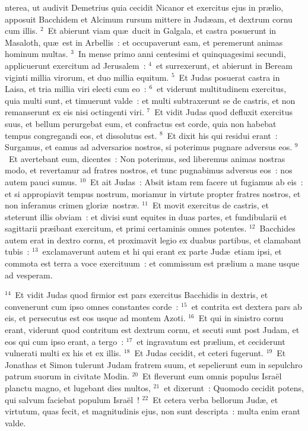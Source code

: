 \bchapter
{}nterea, ut audivit Demetrius quia cecidit Nicanor et exercitus ejus in pr\ae lio, apposuit Bacchidem et Alcimum rursum mittere in Jud\ae am, et dextrum cornu cum illis.
${}^{2}$~Et abierunt viam qu\ae\ ducit in Galgala, et castra posuerunt in Masaloth, qu\ae\ est in Arbellis~: et occupaverunt eam, et peremerunt animas hominum multas.
${}^{3}$~In mense primo anni centesimi et quinquagesimi secundi, applicuerunt exercitum ad Jerusalem~:
${}^{4}$~et surrexerunt, et abierunt in Beream viginti millia virorum, et duo millia equitum.
${}^{5}$~Et Judas posuerat castra in Laisa, et tria millia viri electi cum eo~:
${}^{6}$~et viderunt multitudinem exercitus, quia multi sunt, et timuerunt valde~: et multi subtraxerunt se de castris, et non remanserunt ex eis nisi octingenti viri.
${}^{7}$~Et vidit Judas quod defluxit exercitus suus, et bellum perurgebat eum, et confractus est corde, quia non habebat tempus congregandi eos, et dissolutus est.
${}^{8}$~Et dixit his qui residui erant~: Surgamus, et eamus ad adversarios nostros, si poterimus pugnare adversus eos.
${}^{9}$~Et avertebant eum, dicentes~: Non poterimus, sed liberemus animas nostras modo, et revertamur ad fratres nostros, et tunc pugnabimus adversus eos~: nos autem pauci sumus.
${}^{10}$~Et ait Judas~: Absit istam rem facere ut fugiamus ab eis~: et si appropiavit tempus nostrum, moriamur in virtute propter fratres nostros, et non inferamus crimen glori\ae\ nostr\ae .
${}^{11}$~Et movit exercitus de castris, et steterunt illis obviam~: et divisi sunt equites in duas partes, et fundibularii et sagittarii pr\ae ibant exercitum, et primi certaminis omnes potentes.
${}^{12}$~Bacchides autem erat in dextro cornu, et proximavit legio ex duabus partibus, et clamabant tubis~:
${}^{13}$~exclamaverunt autem et hi qui erant ex parte Jud\ae\ etiam ipsi, et commota est terra a voce exercituum~: et commissum est pr\ae lium a mane usque ad vesperam.


${}^{14}$~Et vidit Judas quod firmior est pars exercitus Bacchidis in dextris, et convenerunt cum ipso omnes constantes corde~:
${}^{15}$~et contrita est dextera pars ab eis, et persecutus est eos usque ad montem Azoti.
${}^{16}$~Et qui in sinistro cornu erant, viderunt quod contritum est dextrum cornu, et secuti sunt post Judam, et eos qui cum ipso erant, a tergo~:
${}^{17}$~et ingravatum est pr\ae lium, et ceciderunt vulnerati multi ex his et ex illis.
${}^{18}$~Et Judas cecidit, et ceteri fugerunt.
${}^{19}$~Et Jonathas et Simon tulerunt Judam fratrem suum, et sepelierunt eum in sepulchro patrum suorum in civitate Modin.
${}^{20}$~Et fleverunt eum omnis populus Isra\"el planctu magno, et lugebant dies multos,
${}^{21}$~et dixerunt~: Quomodo cecidit potens, qui salvum faciebat populum Isra\"el~!
${}^{22}$~Et cetera verba bellorum Jud\ae , et virtutum, quas fecit, et magnitudinis ejus, non sunt descripta~: multa enim erant valde.


